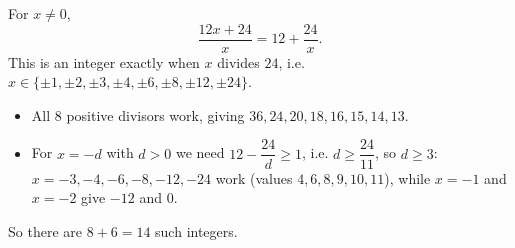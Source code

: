 For $x\ne0$,
\[\dfrac{12x+24}{x}=12+\dfrac{24}{x}.\]
This is an integer exactly when $x$ divides $24$, i.e. $x\in\{\pm1,\pm2,\pm3,\pm4,\pm6,\pm8,\pm12,\pm24\}$.
\begin{itemize}
\item All $8$ positive divisors work, giving $36,24,20,18,16,15,14,13$.
\item For $x=-d$ with $d>0$ we need $12-\dfrac{24}{d}\ge1$, i.e. $d\ge\dfrac{24}{11}$, so $d\ge3$: $x=-3,-4,-6,-8,-12,-24$ work (values $4,6,8,9,10,11$), while $x=-1$ and $x=-2$ give $-12$ and $0$.
\end{itemize}
So there are $8+6=\boxed{14}$ such integers.
